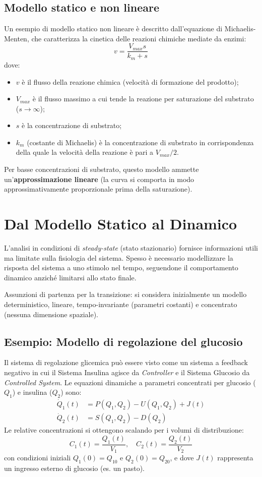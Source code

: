 \subsection{Modello statico e non lineare}
Un esempio di modello statico non lineare è descritto dall'equazione di Michaelis-Menten, che caratterizza la cinetica delle reazioni chimiche mediate da enzimi:
\begin{equation}
    v = \frac{V_{max}s}{k_m + s}
\end{equation}
dove:
\begin{itemize}
    \item $v$ è il flusso della reazione chimica (velocità di formazione del prodotto);
    \item $V_{max}$ è il flusso massimo a cui tende la reazione per saturazione del substrato ($s \to \infty$);
    \item $s$ è la concentrazione di substrato;
    \item $k_m$ (costante di Michaelis) è la concentrazione di substrato in corrispondenza della quale la velocità della reazione è pari a $V_{max}/2$.
\end{itemize}
Per basse concentrazioni di substrato, questo modello ammette un'\textbf{approssimazione lineare} (la curva si comporta in modo approssimativamente proporzionale prima della saturazione).

\section{Dal Modello Statico al Dinamico}
L'analisi in condizioni di \textit{steady-state} (stato stazionario) fornisce informazioni utili ma limitate sulla fisiologia del sistema. Spesso è necessario modellizzare la risposta del sistema a uno stimolo nel tempo, seguendone il comportamento dinamico anziché limitarsi allo stato finale.

Assunzioni di partenza per la transizione: si considera inizialmente un modello deterministico, lineare, tempo-invariante (parametri costanti) e concentrato (nessuna dimensione spaziale).

\subsection{Esempio: Modello di regolazione del glucosio}
Il sistema di regolazione glicemica può essere visto come un sistema a feedback negativo in cui il Sistema Insulina agisce da \textit{Controller} e il Sistema Glucosio da \textit{Controlled System}. Le equazioni dinamiche a parametri concentrati per glucosio ($Q_1$) e insulina ($Q_2$) sono:
\begin{align}
    \dot{Q}_1(t) &= P(Q_1, Q_2) - U(Q_1, Q_2) + J(t) \\
    \dot{Q}_2(t) &= S(Q_1, Q_2) - D(Q_2)
\end{align}
Le relative concentrazioni si ottengono scalando per i volumi di distribuzione:
\begin{equation}
    C_1(t) = \frac{Q_1(t)}{V_1}, \quad C_2(t) = \frac{Q_2(t)}{V_2}
\end{equation}
con condizioni iniziali $Q_1(0) = Q_{10}$ e $Q_2(0) = Q_{20}$, e dove $J(t)$ rappresenta un ingresso esterno di glucosio (es. un pasto).

